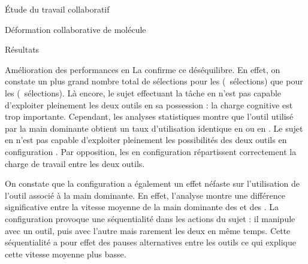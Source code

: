 \documentclass[myfrancais]{mythesis}
\begin{document}
\begin{mypart}{Étude du travail collaboratif}
\begin{mychapter}{Déformation collaborative de molécule}
\begin{mysection}{Résultats}
\begin{mysubsection}{Amélioration des performances en }
					La  confirme ce déséquilibre.
					En effet, on constate un plus grand nombre total de sélections pour les  (~sélections) que pour les  (~sélections).
					Là encore, le sujet effectuant la tâche en  n'est pas capable d'exploiter pleinement les deux outils en sa possession : la charge cognitive est trop importante.
					Cependant, les analyses statistiques montre que l'outil utilisé par la main dominante obtient un taux d'utilisation identique en  ou en .
					Le sujet en  n'est pas capable d'exploiter pleinement les possibilités des deux outils en configuration .
					Par opposition, les  en configuration  répartissent correctement la charge de travail entre les deux outils.

					On constate que la configuration  a également un effet néfaste sur l'utilisation de l'outil associé à la main dominante.
					En effet, l'analyse montre une différence significative entre la vitesse moyenne de la main dominante des  et des .
					La configuration  provoque une séquentialité dans les actions du sujet : il manipule avec un outil, puis avec l'autre mais rarement les deux en même temps.
					Cette séquentialité a pour effet des pauses alternatives entre les outils ce qui explique cette vitesse moyenne plus basse.


\end{mysubsection}
\end{mysection}
\end{mychapter}
\end{mypart}
\end{document}

